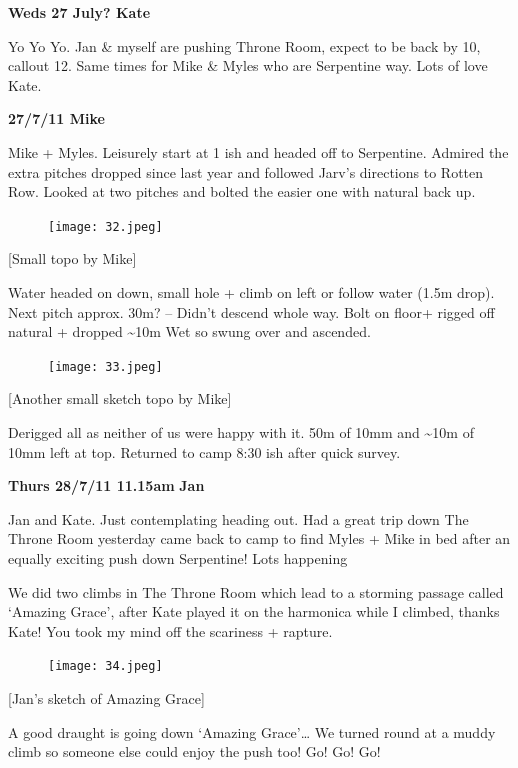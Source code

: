 \textbf{Weds 27 July? Kate}

Yo Yo Yo. Jan \& myself are pushing Throne Room, expect to be back by
10, callout 12. Same times for Mike \& Myles who are Serpentine way.
Lots of love Kate.

\textbf{27/7/11 Mike}

Mike + Myles. Leisurely start at 1 ish and headed off to Serpentine.
Admired the extra pitches dropped since last year and followed Jarv's
directions to Rotten Row. Looked at two pitches and bolted the easier
one with natural back up.

\begin{figure}[htbp]
\centering
\texttt{[image: 32.jpeg]}
\caption{}
\end{figure}

{[}Small topo by Mike{]}

Water headed on down, small hole + climb on left or follow water (1.5m
drop). Next pitch approx. 30m? -- Didn't descend whole way. Bolt on
floor+ rigged off natural + dropped \textasciitilde{}10m Wet so swung
over and ascended.

\begin{figure}[htbp]
\centering
\texttt{[image: 33.jpeg]}
\caption{}
\end{figure}

{[}Another small sketch topo by Mike{]}

Derigged all as neither of us were happy with it. 50m of 10mm and
\textasciitilde{}10m of 10mm left at top. Returned to camp 8:30 ish
after quick survey.

\textbf{Thurs 28/7/11 11.15am} \textbf{Jan}

Jan and Kate. Just contemplating heading out. Had a great trip down The
Throne Room yesterday came back to camp to find Myles + Mike in bed
after an equally exciting push down Serpentine! Lots happening

We did two climbs in The Throne Room which lead to a storming passage
called `Amazing Grace', after Kate played it on the harmonica while I
climbed, thanks Kate! You took my mind off the scariness + rapture.

\begin{figure}[htbp]
\centering
\texttt{[image: 34.jpeg]}
\caption{}
\end{figure}

{[}Jan's sketch of Amazing Grace{]}

A good draught is going down `Amazing Grace'\ldots{} We turned round at
a muddy climb so someone else could enjoy the push too! Go! Go! Go!

